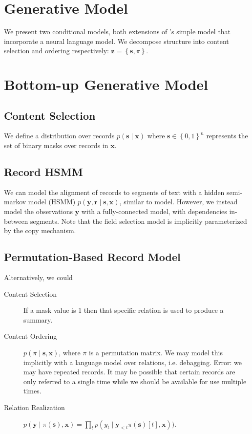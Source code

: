 \documentclass{article}
\newcommand\set[1]{\left\{#1\right\}}
\newcommand{\br}{\mathbf{r}}
\newcommand{\bs}{\mathbf{s}}
\newcommand{\bx}{\mathbf{x}}
\newcommand{\by}{\mathbf{y}}
\newcommand{\bz}{\mathbf{z}}
\begin{document}
\section{Generative Model}
We present two conditional models, both extensions of \citet{liang2009semalign}'s
simple model that incorporate a neural language model.
We decompose structure into content selection and ordering respectively: $\bz = \set{\bs, \pi}$.

\section{Bottom-up Generative Model}
\subsection{Content Selection}
We define a distribution over records $p(\bs\mid\bx)$ where
$\bs\in\set{0,1}^n$ represents the set of binary masks over records in $\bx$.

\subsection{Record HSMM}
We can model the alignment of records to segments of text with a hidden semi-markov model (HSMM)
$p(\by,\br\mid\bs,\bx)$, similar to \citet{liang2009semalign} model.
However, we instead model the observations $\by$ with a fully-connected model,
with dependencies in-between segments.
Note that the field selection model is implicitly parameterized by the copy mechanism.


\subsection{Permutation-Based Record Model}
Alternatively, we could 
\begin{description}
\item[Content Selection]
If a mask value is 1 then that specific relation is used to produce a summary.
\item[Content Ordering]
$p(\pi\mid\bs,\bx)$, where $\pi$ is a permutation matrix.
We may model this implicitly with a language model over relations, i.e. debagging.
Error: we may have repeated records.
It may be possible that certain records are only referred to a single time
while we should be available for use multiple times.
\item[Relation Realization]
$p(\by\mid\pi(\bs),\bx) = \prod_t p(y_t\mid\by_{<t}\pi(\bs)[t],\bx))$.
\end{description}
\end{document}
